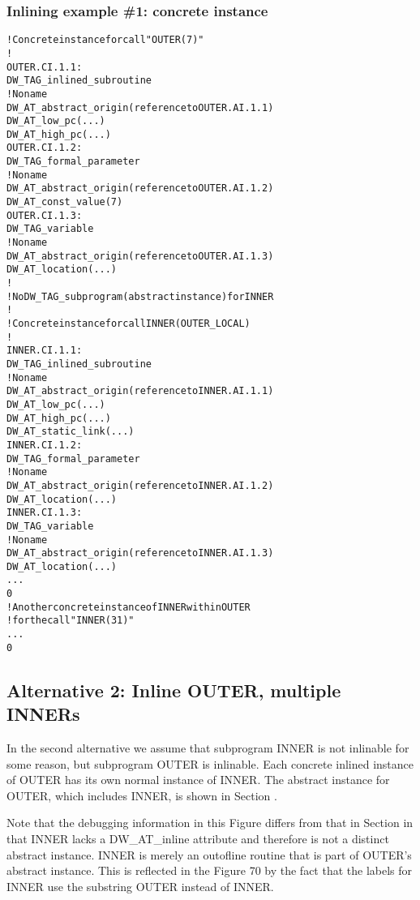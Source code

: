 \subsubsection{Inlining example \#1: concrete instance}
\label{app:inliningexample1concreteinstance}
\begin{alltt}
! Concrete instance for call "OUTER(7)"
!
OUTER.CI.1.1:
    DW\_TAG\_inlined\_subroutine
        ! No name
        DW\_AT\_abstract\_origin(reference to OUTER.AI.1.1)
        DW\_AT\_low\_pc(...)
        DW\_AT\_high\_pc(...)
OUTER.CI.1.2:
        DW\_TAG\_formal\_parameter
            ! No name
            DW\_AT\_abstract\_origin(reference to OUTER.AI.1.2)
            DW\_AT\_const\_value(7)
OUTER.CI.1.3:
        DW\_TAG\_variable
            ! No name
            DW\_AT\_abstract\_origin(reference to OUTER.AI.1.3)
            DW\_AT\_location(...)
        !
        ! No DW\_TAG\_subprogram (abstract instance) for INNER
        !
        ! Concrete instance for call INNER(OUTER\_LOCAL)
        !
INNER.CI.1.1:
        DW\_TAG\_inlined\_subroutine
            ! No name
            DW\_AT\_abstract\_origin(reference to INNER.AI.1.1)
            DW\_AT\_low\_pc(...)
            DW\_AT\_high\_pc(...)
            DW\_AT\_static\_link(...)
INNER.CI.1.2:
            DW\_TAG\_formal\_parameter
                ! No name
                DW\_AT\_abstract\_origin(reference to INNER.AI.1.2)
                DW\_AT\_location(...)
INNER.CI.1.3:
             DW\_TAG\_variable
                ! No name
                DW\_AT\_abstract\_origin(reference to INNER.AI.1.3)
                DW\_AT\_location(...)
            ...
            0
        ! Another concrete instance of INNER within OUTER
        ! for the call "INNER(31)"
        ...
        0
\end{alltt}

\subsection{Alternative 2: Inline OUTER, multiple INNERs}
\label{app:inlineoutermultiipleinners}


In the second alternative we assume that subprogram INNER
is not inlinable for some reason, but subprogram OUTER is
inlinable. Each concrete inlined instance of OUTER has its
own normal instance of INNER. The abstract instance for OUTER,
which includes INNER, is shown in 
Section .

Note that the debugging information in this Figure differs from
that in 
Section 
in that INNER lacks a DW\_AT\_inline attribute
and therefore is not a distinct abstract instance. INNER
is merely an out\dash of\dash line routine that is part of OUTER’s
abstract instance. This is reflected in the Figure 70 by
the fact that the labels for INNER use the substring OUTER
instead of INNER.

